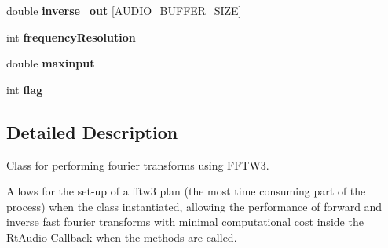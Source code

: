 \begin{DoxyCompactItemize}
\item 
\hypertarget{classfft_a290d4177db41a835118d5e0003ec7e2f}{double {\bfseries inverse\-\_\-out} \mbox{[}A\-U\-D\-I\-O\-\_\-\-B\-U\-F\-F\-E\-R\-\_\-\-S\-I\-Z\-E\mbox{]}}\label{classfft_a290d4177db41a835118d5e0003ec7e2f}

\item 
\hypertarget{classfft_ae744c22f8e06bdd1a3fc471bcff821a4}{int {\bfseries frequency\-Resolution}}\label{classfft_ae744c22f8e06bdd1a3fc471bcff821a4}

\item 
\hypertarget{classfft_a01978c3e238491e7b8ecd75340e0ca3c}{double {\bfseries maxinput}}\label{classfft_a01978c3e238491e7b8ecd75340e0ca3c}

\item 
\hypertarget{classfft_a66afecdbae4bef314698644fc3f280de}{int {\bfseries flag}}\label{classfft_a66afecdbae4bef314698644fc3f280de}

\end{DoxyCompactItemize}


\subsection{Detailed Description}
Class for performing fourier transforms using F\-F\-T\-W3. 

Allows for the set-\/up of a fftw3 plan (the most time consuming part of the process) when the class instantiated, allowing the performance of forward and inverse fast fourier transforms with minimal computational cost inside the Rt\-Audio Callback when the methods are called. 

